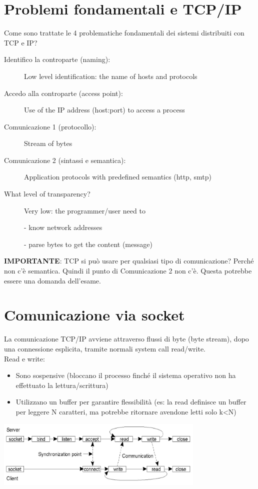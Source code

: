 \section{Problemi fondamentali e TCP/IP}
Come sono trattate le 4 problematiche fondamentali dei sistemi distribuiti con TCP e IP?
\begin{description}
    \item[Identifico la controparte (naming):]
    \item[] Low level identification: the name of hosts and protocols
    \item[Accedo alla controparte (access point):]
    \item[] Use of the IP address (host:port) to access a process
    \item[Comunicazione 1 (protocollo):]
    \item[] Stream of bytes
    \item[Comunicazione 2 (sintassi e semantica):]
    \item[] Application protocols with predefined semantics (http, smtp)
    \item[What level of transparency?] Very low: the programmer/user need to
    \item[] - know network addresses
    \item[] - parse bytes to get the content (message)
\end{description}

\textbf{IMPORTANTE}: TCP si può usare per qualsiasi tipo di comunicazione? Perché non c'è semantica. Quindi il punto di Comunicazione 2 non c'è. Questa potrebbe essere una domanda dell'esame.

\section{Comunicazione via socket}
La comunicazione TCP/IP avviene attraverso flussi di byte (byte stream), dopo una connessione esplicita, tramite normali system call read/write.
\\Read e write:
\begin{itemize}
    \item Sono sospensive (bloccano il processo finché il sistema operativo non ha effettuato la lettura/scrittura)
    \item Utilizzano un buffer per garantire flessibilità (es: la read definisce un buffer per leggere N caratteri, ma potrebbe ritornare avendone letti solo k<N)
\end{itemize}
\begin{center}
    \includegraphics[width=0.75\textwidth]{img/socket_comunicazione1.jpg}
\end{center}

